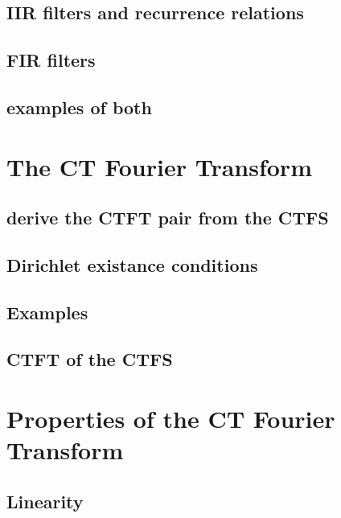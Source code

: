 \documentclass{article}
\begin{document}
\subsection{IIR filters and recurrence relations}
\label{sec:org928ff1a}

\subsection{FIR filters}
\label{sec:org15ab380}

\subsection{examples of both}
\label{sec:orgbb45d7e}

\newpage
\section{The CT Fourier Transform}
\label{sec:org76eb4f9}

\subsection{derive the CTFT pair from the CTFS}
\label{sec:orgdf07b5a}

\subsection{Dirichlet existance conditions}
\label{sec:org6311427}

\subsection{Examples}
\label{sec:org126acc4}

\subsection{CTFT of the CTFS}
\label{sec:orga61d23b}

\newpage
\section{Properties of the CT Fourier Transform}
\label{sec:org15bd740}

\subsection{Linearity}
\label{sec:org21f9e2d}
\end{document}
